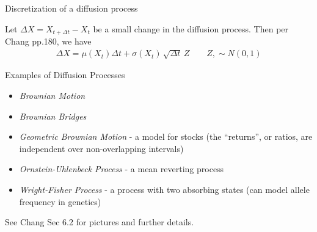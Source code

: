 \documentclass[10pt]{beamer}
\begin{document}
\begin{frame}{Discretization of a diffusion process}

Let $\Delta X = X_{t + \Delta t} - X_t$ be a small change in the diffusion process. Then per Chang pp.180, we have
	\begin{align*}
	 \Delta X = \mu(X_t) \Delta t + \sigma(X_t) \, \sqrt{\Delta t} \, Z  \qquad Z, \sim N(0,1)
	\end{align*}
		
\end{frame}



\begin{frame}{Examples of Diffusion Processes}

\begin{itemize}
	\item \textit{Brownian Motion} \pause 
	\item \textit{Brownian Bridges} \pause 
	\item \textit{Geometric Brownian Motion} - a model for stocks (the ``returns'', or ratios, are independent over non-overlapping intervals) \pause 
	\item \textit{Ornstein-Uhlenbeck Process} - a mean reverting process \pause 
	\item \textit{Wright-Fisher Process} - a process with two absorbing states (can model allele frequency in genetics)
\end{itemize}
	
See Chang Sec 6.2 for pictures and further details.
\end{frame}
\end{document}

